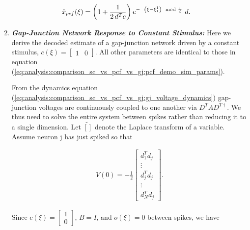 \begin{enumerate}
\begin{align}	\label{eq:analysis:comparison_sc_vs_pcf_vs_gj:const_dynamics:pcf_network_estimate_steady_state}
\hat{x}_{pcf}(\xi)
&= 
\left(
1 + 
\frac
{
	1
}
{
	2 \, d^T c
}
\right)
e^
{
	- \hspace{2mm}
	\left(
		\xi - \xi_1^1
	\right)
	\mod
	{
		\frac
		{
			1
		}
		{
			\phi
		}
	}
}
\, \, d.
\end{align}

\item \textbf{\textit{Gap-Junction Network Response to Constant Stimulus:}} Here we derive the decoded estimate of a gap-junction network driven by a constant stimulus, $c(\xi) = \begin{bmatrix}
1 & 0
\end{bmatrix}
$. All other parameters are identical to those in equation (\ref{eq:analysis:comparison_sc_vs_pcf_vs_gj:pcf_demo_sim_params}).

From the dynamics equation (\ref{eq:analysis:comparison_sc_vs_pcf_vs_gj:gj_voltage_dynamics}) gap-junction voltages are continuously coupled to one another via $D^T A D^{T \dagger}$. We thus need to solve the entire system between spikes rather than reducing it to a single dimension. Let $\tilde{[]}$ denote the Laplace transform of a variable. Assume neuron j has just spiked so that 

\begin{align*}
V(0) = -\frac{1}{2}
\begin{bmatrix}
d_1 ^T d_j
\\
\vdots
\\
d_j^T d_j
\\
\vdots
\\
d_N^T d_j
\end{bmatrix}.
\end{align*}

Since $c(\xi) = \begin{bmatrix}
1 \\ 0
\end{bmatrix}$, $B = I$, and $o(\xi) = 0$ between spikes, we have


\end{enumerate}
